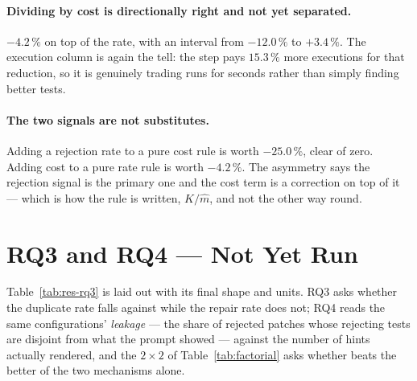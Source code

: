 \paragraph{Dividing by cost is directionally right and not yet separated.}
$-4.2\,\%$ on top of the rate, with an interval from $-12.0\,\%$ to
$+3.4\,\%$. The execution column is again the tell: the step pays $15.3\,\%$
more executions for that reduction, so it is genuinely trading runs for
seconds rather than simply finding better tests.

\paragraph{The two signals are not substitutes.} Adding a rejection rate to a
pure cost rule is worth $-25.0\,\%$, clear of zero. Adding cost to a pure rate
rule is worth $-4.2\,\%$. The asymmetry says the rejection signal is the
primary one and the cost term is a correction on top of it --- which is how the
rule is written, $K/\hat{m}$, and not the other way round.

\section{RQ3 and RQ4 --- Not Yet Run}
\label{sec:res-blockb}


Table~\ref{tab:res-rq3} is laid out with its final shape and units. RQ3 asks
whether the duplicate rate falls against  while the repair rate
does not; RQ4 reads the same configurations' \emph{leakage} --- the share of
rejected patches whose rejecting tests are disjoint from what the prompt
showed --- against the number of hints actually rendered, and the $2\times2$
of Table~\ref{tab:factorial} asks whether  beats the better
of the two mechanisms alone.

